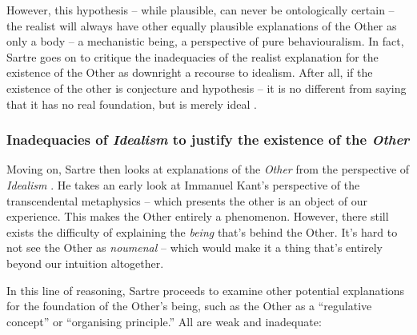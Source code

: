 However, this hypothesis -- while plausible, can never be ontologically certain  -- the realist will always have other equally plausible explanations of the Other as only a body -- a mechanistic being, a perspective of pure behaviouralism.   In fact, Sartre goes on to critique the inadequacies of the realist explanation for the existence of the Other as downright a recourse to idealism. After all, if the existence of the other is conjecture and hypothesis -- it is no different from saying that it has no real foundation, but is merely ideal \autocite[312]{sartre}.

\subsubsection{Inadequacies of \emph{Idealism} to justify the existence of the \emph{Other}}

Moving on, Sartre then looks at explanations of the \emph{Other} from the perspective of \emph{Idealism} \autocite[312]{sartre}. He takes an early look at Immanuel Kant's perspective of the transcendental metaphysics -- which presents the other is an object of our experience. This makes the Other entirely a phenomenon. However, there still exists the difficulty of explaining the \emph{being} that's behind the Other. It's hard to not see the Other as \emph{noumenal} -- which would make it a thing that's entirely beyond our intuition altogether.

In this line of reasoning, Sartre proceeds to examine other \autocite[315]{sartre} potential explanations for the foundation of the Other's being, such as the Other as a \enquote{regulative concept} or \enquote{organising principle.} All are weak and inadequate:


